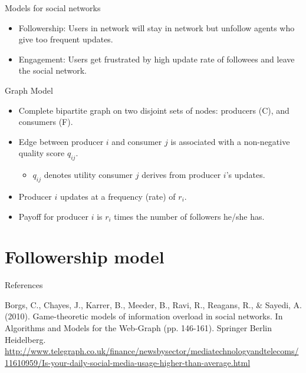 \documentclass[aspectratio=169]{beamer}
\newcommand{\bi}{\begin{itemize}}
\newcommand{\ei}{\end{itemize}}
\begin{document}
\begin{frame}{Models for social networks}
    \bi
\item Followership: Users in network will stay in network but unfollow agents
    who give too frequent updates.
    \pause
\item Engagement: Users get frustrated by high update rate of followees and
    leave the social network.
    \ei
\end{frame}

\begin{frame}{Graph Model}
    \bi
\item Complete bipartite graph on two disjoint sets of nodes: producers (C), and
    consumers (F).
    \pause
\item Edge between producer $i$ and consumer $j$ is associated with a non-negative
    quality score $q_{ij}$.
    \pause
    \bi
\item $q_{ij}$ denotes utility consumer $j$ derives from producer $i$'s updates.
    \ei
    \pause
\item Producer $i$ updates at a frequency (rate) of $r_{i}$.
    \pause
\item Payoff for producer $i$ is $r_i$ times the number of followers he/she has.
    \ei
\end{frame}

\section{Followership model}
\begin{frame}
\end{frame}

\begin{frame}{References}
\begin{thebibliography}{9}
    Borgs, C., Chayes, J., Karrer, B., Meeder, B., Ravi, R., Reagans,
    R., \& Sayedi, A. (2010). Game-theoretic models of information overload in
    social networks. In Algorithms and Models for the Web-Graph (pp. 146-161).
    Springer Berlin Heidelberg.
    \url{http://www.telegraph.co.uk/finance/newsbysector/mediatechnologyandtelecoms/11610959/Is-your-daily-social-media-usage-higher-than-average.html}
\end{thebibliography}

\end{frame}
\end{document}
